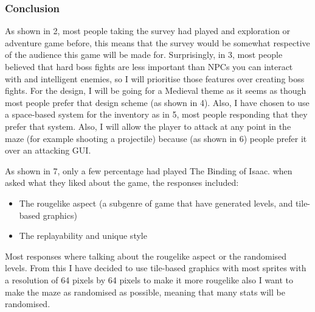 \documentclass[../Main.tex]{subfiles}
\begin{document}
    \subsubsection{Conclusion}
        As shown in \figurename{ 2}, most people taking the survey had played and exploration or adventure game before, this means that the survey would be somewhat respective of the audience this game will be made for. Surprisingly, in \figurename{ 3}, most people believed that hard boss fights are less important than NPCs you can interact with and intelligent enemies, so I will prioritise those features over creating boss fights. For the design, I will be going for a Medieval theme as it seems as though most people prefer that design scheme (as shown in \figurename{ 4}). Also, I have chosen to use a space-based system for the inventory as in \figurename{ 5}, most people responding that they prefer that system. Also, I will allow the player to attack at any point in the maze (for example shooting a projectile) because (as shown in \figurename{ 6}) people prefer it over an attacking GUI.

        As shown in \figurename{ 7}, only a few percentage had played The Binding of Isaac. when asked what they liked about the game, the responses included:
        \begin{itemize}
            \item The rougelike aspect (a subgenre of game that have generated levels, and tile-based graphics)
            \item The replayability and unique style
        \end{itemize}
        Most responses where talking about the rougelike aspect or the randomised levels. From this I have decided to use tile-based graphics with most sprites with a resolution of 64 pixels by 64 pixels to make it more rougelike also I want to make the maze as randomised as possible, meaning that many stats will be randomised.

    \clearpage
\end{document}
